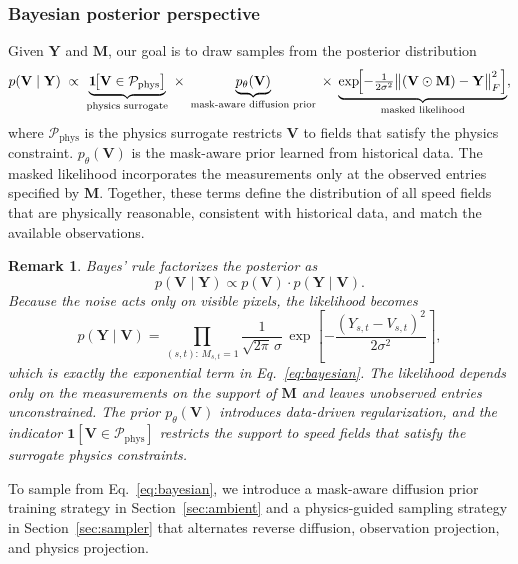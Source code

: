 \documentclass[a4paper,fleqn]{cas-sc}
\newtheorem{remark}{Remark}
\numberwithin{equation}{section}
\begin{document}
\subsubsection{Bayesian posterior perspective}\label{sec:bayes_posterior}
Given $\mathbf{Y}$ and $\mathbf{M}$, our goal is to draw samples from the posterior distribution
\begin{equation}
    p(\mathbf V \mid  \mathbf Y)\;\propto\;
    \underbrace{\mathbf 1\!\bigl[\mathbf V\in\mathcal P_{\text{phys}}\bigr]}_{\text{physics surrogate}}
    \;\times\;
    \underbrace{p_\theta(\mathbf V)}_{\text{mask-aware diffusion prior}}
    \;\times\;
    \underbrace{\exp \!\Bigl[-\tfrac{1}{2\sigma^{2}}\bigl\|(\mathbf V\odot\mathbf M)-\mathbf Y\bigr\|_F^{2}\Bigr]}_{\text{masked likelihood}},
    \label{eq:bayesian}
\end{equation}
where $\mathcal P_{\text{phys}}$ is the physics surrogate restricts $\mathbf V$ to fields that satisfy the physics constraint.  $p_\theta(\mathbf V)$ is the mask-aware prior learned from historical data. The masked likelihood incorporates the measurements only at the observed entries specified by $\mathbf M$.
Together, these terms define the distribution of all speed fields that are physically reasonable, consistent with historical data, and match the available observations.
\begin{remark}
Bayes' rule factorizes the posterior as
\begin{equation}
    p(\mathbf V\mid \mathbf Y) 
    \propto p(\mathbf V) \cdot p(\mathbf Y\mid \mathbf V).
\end{equation}
Because the noise acts only on visible pixels, the likelihood becomes
\begin{equation}
    p(\mathbf Y\mid \mathbf V)
    =\prod_{(s,t):\,M_{s,t}=1}
      \frac{1}{\sqrt{2\pi}\,\sigma}\,
      \exp\!\left[
            -\frac{(Y_{s,t}-V_{s,t})^{2}}{2\sigma^{2}}
          \right],
\end{equation}
which is exactly the exponential term in Eq.~\eqref{eq:bayesian}. The likelihood depends only on the measurements on the support of $\mathbf M$ and leaves unobserved entries unconstrained. The prior $p_\theta(\mathbf V)$ introduces data-driven regularization, and the indicator $\mathbf 1[\mathbf V\in\mathcal P_{\text{phys}}]$ restricts the support to speed fields that satisfy the surrogate physics constraints.
\end{remark}

To sample from Eq.~\eqref{eq:bayesian}, we introduce a mask-aware diffusion prior training strategy in Section~\ref{sec:ambient} and a physics-guided sampling strategy in Section~\ref{sec:sampler} that alternates reverse diffusion, observation projection, and physics projection.
\end{document}
